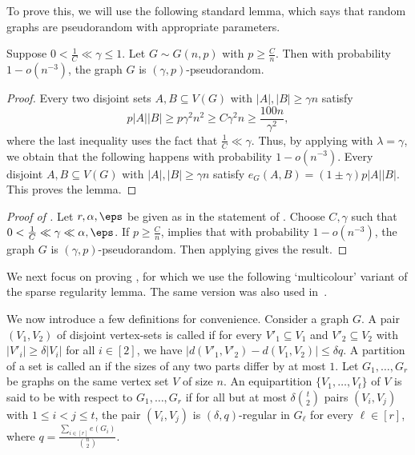 \documentclass[10pt,a4paper,reqno]{amsart}
\begin{document}
To prove this, we will use the following standard lemma, which says that random graphs are pseudorandom with appropriate parameters.
\begin{lemma} \label{lem:pseudorandom}
Suppose $0 < \frac{1}{C} \ll \gamma \le 1$. Let $G\sim G(n,p)$ with $p\ge \frac{C}{n}$. Then with probability $1-o(n^{-3})$, the graph $G$ is $(\gamma,p)$-pseudorandom.
\end{lemma}
\begin{proof}
Every two disjoint sets $A,B\subseteq V(G)$ with $|A|,|B|\ge \gamma n$ satisfy 
\[
p|A||B|\ge p\gamma^2 n^2\ge C\gamma^2 n\ge \frac{100n}{\gamma^2},
\]
where the last inequality uses the fact that $\frac{1}{C} \ll \gamma$. Thus, by applying  with $\lambda = \gamma$, we obtain that the following happens with probability $1-o(n^{-3})$. Every disjoint $A,B\subseteq V(G)$ with $|A|,|B|\ge \gamma n$ satisfy $e_G(A,B) = (1\pm \gamma)p|A||B|$. This proves the lemma.
\end{proof}

\begin{proof}[Proof of ]

Let $r, \alpha, \eps$ be given as in the statement of . Choose $C, \gamma$ such that $0< \frac{1}{C} \ll \gamma \ll \alpha, \eps$. If $p \ge \frac{C}{n}$,  implies that with probability $1-o(n^{-3})$, the graph $G$ is $(\gamma,p)$-pseudorandom. Then applying  gives the result. 
\end{proof}


We next focus on proving , for which we use the following `multicolour' variant of the sparse regularity lemma. The same version was also used in~\cite{Gishboliner2021colourbiased}. 

We now introduce a few definitions for convenience. Consider a graph $G$. A pair $(V_1,V_2)$ of disjoint vertex-sets is called  if for every $V'_1\subseteq V_1$ and $V'_2\subseteq V_2$ with $|V'_i| \ge \delta |V_i|$ for all $i\in [2]$, we have $|d(V'_1,V'_2) - d(V_1,V_2)|\le \delta q$. A partition of a set is called an  if the sizes of any two parts differ by at most $1$. 
Let $G_1,\dots,G_r$ be graphs on the same vertex set $V$ of size $n$. An equipartition $\{V_1,\dots,V_t\}$ of $V$ is said to be  with respect to $G_1,\dots,G_r$ if for all but at most $\delta \binom{t}{2}$ pairs $(V_i,V_j)$ with $1\le i<j\le t$, the pair $(V_i,V_j)$ is $(\delta, q)$-regular in $G_\ell$ for every $\ell \in [r]$, where $q= \frac{\sum_{i\in [r]}e(G_i)}{\binom{n}{2}}$.
\end{document}
